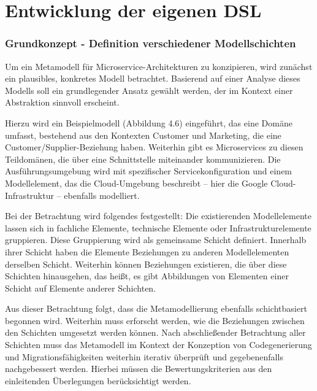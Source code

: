
\newpage
\section{Entwicklung der eigenen DSL}

\subsubsection{Grundkonzept - Definition verschiedener Modellschichten}

Um ein Metamodell für Microservice-Architekturen zu konzipieren, wird zunächst ein plausibles, konkretes Modell betrachtet. Basierend auf einer Analyse dieses Modells soll ein grundlegender Ansatz gewählt werden, der im Kontext einer Abstraktion sinnvoll erscheint.

Hierzu wird ein Beispielmodell (Abbildung 4.6) eingeführt, das eine Domäne umfasst, bestehend aus den Kontexten Customer und Marketing, die eine Customer/Supplier-Beziehung haben. Weiterhin gibt es Microservices zu diesen Teildomänen, die über eine Schnittstelle miteinander kommunizieren. Die Ausführungsumgebung wird mit spezifischer Servicekonfiguration und einem Modellelement, das die Cloud-Umgebung beschreibt – hier die Google Cloud-Infrastruktur – ebenfalls modelliert.

Bei der Betrachtung wird folgendes festgestellt: Die existierenden Modellelemente lassen sich in fachliche Elemente, technische Elemente oder Infrastrukturelemente gruppieren. Diese Gruppierung wird als gemeinsame Schicht definiert. Innerhalb ihrer Schicht haben die Elemente Beziehungen zu anderen Modellelementen derselben Schicht. Weiterhin können Beziehungen existieren, die über diese Schichten hinausgehen, das heißt, es gibt Abbildungen von Elementen einer Schicht auf Elemente anderer Schichten.

Aus dieser Betrachtung folgt, dass die Metamodellierung ebenfalls schichtbasiert begonnen wird. Weiterhin muss erforscht werden, wie die Beziehungen zwischen den Schichten umgesetzt werden können. Nach abschließender Betrachtung aller Schichten muss das Metamodell im Kontext der Konzeption von Codegenerierung und Migrationsfähigkeiten weiterhin iterativ überprüft und gegebenenfalls nachgebessert werden. Hierbei müssen die Bewertungskriterien aus den einleitenden Überlegungen berücksichtigt werden.


